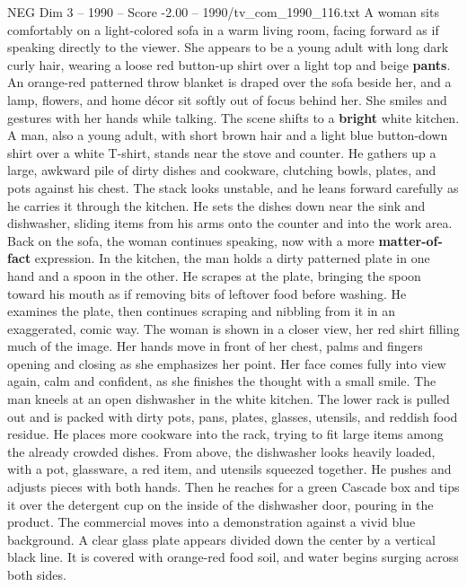 \begin{textsample}{NEG Dim 3 – 1990 – Score -2.00 – 1990/tv\_com\_1990\_116.txt}  \label{ex:f3_neg_047}
A woman sits comfortably on a light-colored sofa in a warm living room, facing forward as if speaking directly to the viewer.
She appears to be a young adult with long dark curly hair, wearing a loose red button-up shirt over a light top and beige \textbf{pants}.
An orange-red patterned throw blanket is draped over the sofa beside her, and a lamp, flowers, and home décor sit softly out of focus behind her.
She smiles and gestures with her hands while talking.
The scene shifts to a \textbf{bright} white kitchen.
A man, also a young adult, with short brown hair and a light blue button-down shirt over a white T-shirt, stands near the stove and counter.
He gathers up a large, awkward pile of dirty dishes and cookware, clutching bowls, plates, and pots against his chest.
The stack looks unstable, and he leans forward carefully as he carries it through the kitchen.
He sets the dishes down near the sink and dishwasher, sliding items from his arms onto the counter and into the work area.
Back on the sofa, the woman continues speaking, now with a more \textbf{matter-of-fact} expression.
In the kitchen, the man holds a dirty patterned plate in one hand and a spoon in the other.
He scrapes at the plate, bringing the spoon toward his mouth as if removing bits of leftover food before washing.
He examines the plate, then continues scraping and nibbling from it in an exaggerated, comic way.
The woman is shown in a closer view, her red shirt filling much of the image.
Her hands move in front of her chest, palms and fingers opening and closing as she emphasizes her point.
Her face comes fully into view again, calm and confident, as she finishes the thought with a small smile.
The man kneels at an open dishwasher in the white kitchen.
The lower rack is pulled out and is packed with dirty pots, pans, plates, glasses, utensils, and reddish food residue.
He places more cookware into the rack, trying to fit large items among the already crowded dishes.
From above, the dishwasher looks heavily loaded, with a pot, glassware, a red item, and utensils squeezed together.
He pushes and adjusts pieces with both hands.
Then he reaches for a green Cascade box and tips it over the detergent cup on the inside of the dishwasher door, pouring in the product.
The commercial moves into a demonstration against a vivid blue background.
A clear glass plate appears divided down the center by a vertical black line.
It is covered with orange-red food soil, and water begins surging across both sides.

\end{textsample}
